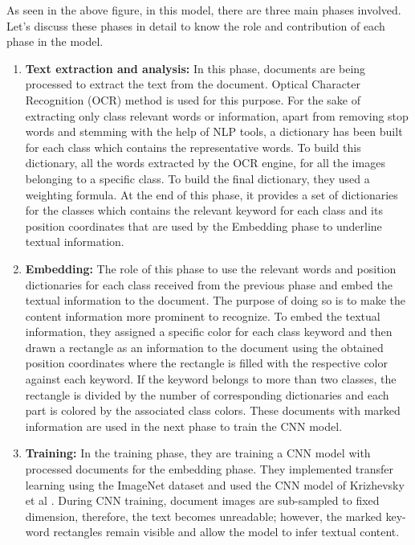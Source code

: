 \par
As seen in the above figure, in this model, there are three main phases involved. Let's discuss these phases in detail to know the role and contribution of each phase in the model.
\begin{enumerate}
   \item \textbf{Text extraction and analysis:} In this phase, documents are being processed to extract the text from the document. Optical Character Recognition (OCR) \cite{ocr} method is used for this purpose. For the sake of extracting only class relevant words or information, apart from removing stop words and stemming with the help of NLP tools, a dictionary has been built for each class which contains the representative words. To build this dictionary, all the words extracted by the OCR engine, for all the images belonging to a specific class. To build the final dictionary, they used a weighting formula. At the end of this phase, it provides a set of dictionaries for the classes which contains the relevant keyword for each class and its position coordinates that are used by the Embedding phase to underline textual information.
    \item \textbf{Embedding:} The role of this phase to use the relevant words and position dictionaries for each class received from the previous phase and embed the textual information to the document. The purpose of doing so is to make the content information more prominent to recognize. To embed the textual information, they assigned a specific color for each class keyword and then drawn a rectangle as an information to the document using the obtained position coordinates where the rectangle is filled with the respective color against each keyword. If the keyword belongs to more than two classes, the rectangle is divided by the number of corresponding dictionaries and each part is colored by the associated class colors. These documents with marked information are used in the next phase to train the CNN model.
     \item \textbf{Training:} In the training phase, they are training a CNN model with processed documents for the embedding phase. They implemented transfer learning using the ImageNet dataset and used the CNN model of Krizhevsky et al \cite{Krizhevsky:2017:ICD:3098997.3065386}.  During CNN training, document images are sub-sampled to fixed dimension, therefore, the text becomes unreadable; however, the marked key-word rectangles remain visible and allow the model to infer textual content.
\end{enumerate}
\par
